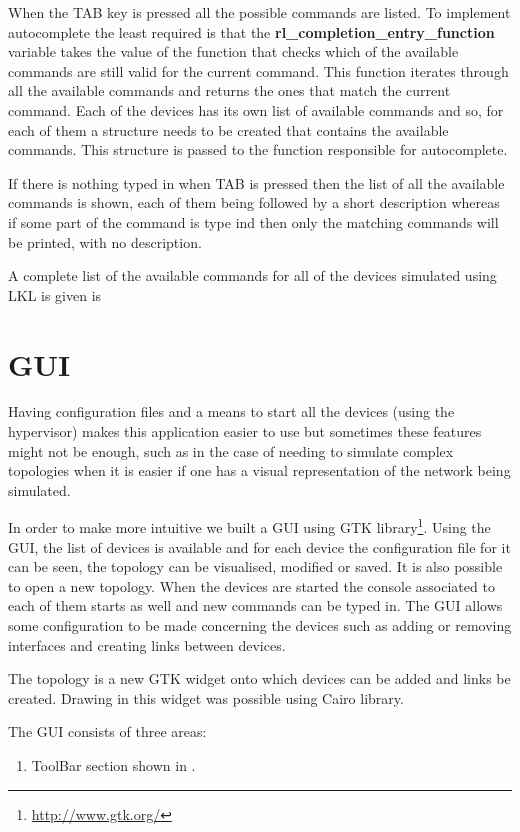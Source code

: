 {{When the TAB key is pressed all the possible commands are listed. To implement autocomplete the least required 
is that the \textbf{rl_completion_entry_function} variable takes the value of the function that checks which 
of the available commands are still valid for the current command. This function iterates through all 
the available commands and returns the ones that match the current command. Each of the devices has its own 
list of available commands and so, for each of them a structure needs to be created that contains the 
available commands. This structure is passed to the function responsible for autocomplete. 

If there is nothing typed in when TAB is pressed then the list of all the available commands is shown, 
each of them being followed by a short description whereas if some part of the command is type ind then only 
the matching commands will be printed, with no description.

A complete list of the available commands for all of the devices simulated using LKL is given is 

\section{GUI}
\label{sec:gui}
Having configuration files and a means to start all the devices (using the hypervisor) makes this application 
easier to use but sometimes these features might not be enough, such as in the case of needing to simulate complex 
topologies when it is easier if one has a visual representation of the network being simulated.

In order to make \project more intuitive we built a GUI using GTK library\footnote{\url{http://www.gtk.org/}}. 
Using the GUI, the list of devices is available and for each device the configuration file for it can be seen, 
the topology can be visualised, modified or saved. It is also possible to open a new topology. When the devices 
are started the console associated to each of them starts as well and new commands can be typed in. The GUI 
allows some configuration to be made concerning the devices such as adding or removing interfaces and creating 
links between devices.

The topology is a new GTK widget onto which devices can be added and links be created. Drawing in this widget was possible using Cairo library.

The GUI consists of three areas:
\begin{enumerate}
\item ToolBar section shown in .


\end{enumerate}}}
